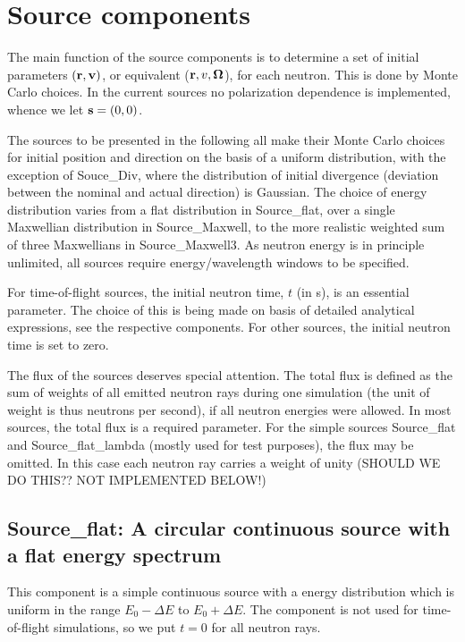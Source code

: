 
\chapter{Source components}
The main function of the source components is to determine a set of initial
parameters $({\bf r}, {\bf v})$, or equivalent (${\bf r}, v, \mbox{\boldmath $\Omega$} $),
for each neutron. This is done by Monte Carlo choices. 
In the current sources no polarization dependence is implemented, 
whence we let ${\bf s}=(0,0)$.

The sources to be presented in the following all make their Monte Carlo
choices for initial position and direction on the basis of a 
uniform distribution, with the exception of Souce\_Div, where the 
distribution of initial divergence (deviation between the nominal and
actual direction) is Gaussian. The choice of energy distribution
varies from a flat distribution in Source\_flat, over a single
Maxwellian distribution in Source\_Maxwell, to the more realistic
weighted sum of three Maxwellians in Source\_Maxwell3.
As neutron energy is in principle unlimited, all sources require
energy/wavelength windows to be specified.

For time-of-flight sources, the initial neutron time, $t$ (in s), is
an essential parameter. The choice of this is being made on basis of
detailed analytical expressions, see the respective components. 
For other sources, the initial neutron time is set to zero.

The flux of the sources deserves special attention. The total flux is defined
as the sum of weights of all emitted neutron rays during one simulation 
(the unit of weight is thus neutrons per second), if all neutron energies
were allowed. In most sources, the total flux is a required parameter.
For the simple sources Source\_flat and Source\_flat\_lambda (mostly used
for test purposes), the flux may be omitted. In this case 
each neutron ray carries a weight of unity (SHOULD WE DO THIS?? 
NOT IMPLEMENTED BELOW!)

\section{Source\_flat: A circular continuous source with a flat energy spectrum}
\label{sourceaim}

This component is 
a simple continuous source with a energy distribution which is uniform
in the range $E_0 - \Delta E$ to $E_0 + \Delta E$.
The component is not used for time-of-flight simulations,
so we put $t=0$ for all neutron rays.

